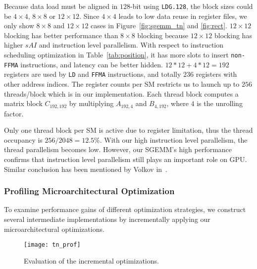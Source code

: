 Because data load must be aligned in $128$-bit using 
{\tt LDG.128}, the block sizes could be $4\times 4$, $8\times 8$ or $12\times 12$. 
Since $4\times 4$ leads to low data reuse in register files, we only show $8\times8$ and $12\times12$ cases in Figure~\ref{fig:sgemm_tn} and \ref{fig:rect}.
$12\times12$ blocking has better performance than $8\times8$ blocking because $12\times12$ blocking has higher $sAI$ and instruction level parallelism. 
With respect to instruction scheduling optimization in Table~\ref{tab:position}, it has more slots to insert {\tt non-FFMA} instructions, and latency can be better hidden.
$12*12+4*12=192$ registers are used by {\tt LD} and {\tt FFMA} instructions, and totally $236$ registers with other address indices. 
The register counts per SM restricts us to launch up to $256$ threads/block which is in our implementation. 
Each thread block computes a matrix block $C_{192, 192}$ by multiplying $A_{192,4}$ and $B_{4, 192}$, where $4$ is the unrolling factor.


Only one thread block per SM is active due to register limitation, thus the thread occupancy is $256/2048=12.5\%$.
With our high instruction level parallelism, the thread parallelism becomes low.
However, our SGEMM's high performance confirms that instruction level parallelism still plays an important role on GPU.
Similar conclusion has been mentioned by Volkov in~\cite{volkov2010better}.

\subsubsection{Profiling Microarchitectural Optimization}

To examine performance gains of different optimization strategies, we construct several intermediate 
implementations by incrementally applying our microarchitectural optimizations.
\begin{figure}[htbp]
\begin{center}
\texttt{[image: tn\_prof]}
    \caption{Evaluation of the incremental optimizations.}
\label{fig:th_prof}
\end{center}
\end{figure}

